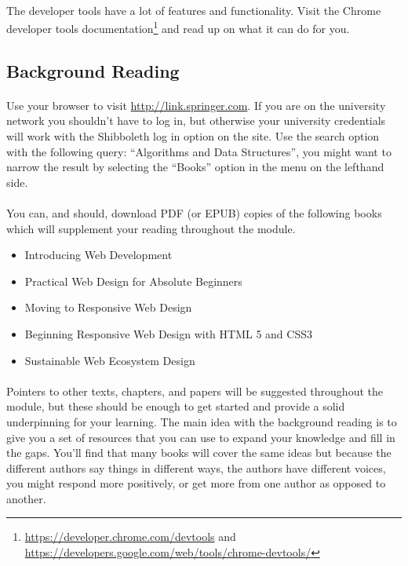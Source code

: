 \documentclass[10pt, a4paper]{article}
\begin{document}
\paragraph{} The developer tools have a lot of features and functionality. Visit the Chrome developer tools documentation\footnote{\url{https://developer.chrome.com/devtools} and \url{https://developers.google.com/web/tools/chrome-devtools/}} and read up on what it can do for you.

\subsection{Background Reading}

\paragraph{} Use your browser to visit \url{http://link.springer.com}. If you are on the university network you shouldn't have to log in, but otherwise your university credentials will work with the Shibboleth log in option on the site. Use the search option with the following query: ``Algorithms and Data Structures'', you might want to narrow the result by selecting the ``Books'' option in the menu on the lefthand side.

\paragraph{} You can, and should, download PDF (or EPUB) copies of the following books which will supplement your reading throughout the module.

\begin{itemize}

\item Introducing Web Development
\item Practical Web Design for Absolute Beginners
\item Moving to Responsive Web Design
\item Beginning Responsive Web Design with HTML 5 and CSS3
\item Sustainable Web Ecosystem Design

\end{itemize}

\paragraph{} Pointers to other texts, chapters, and papers will be suggested throughout the module, but these should be enough to get started and provide a solid underpinning for your learning. The main idea with the background reading is to give you a set of resources that you can use to expand your knowledge and fill in the gaps. You'll find that many books will cover the same ideas but because the different authors say things in different ways, the authors have different voices, you might respond more positively, or get more from one author as opposed to another.
\end{document}
